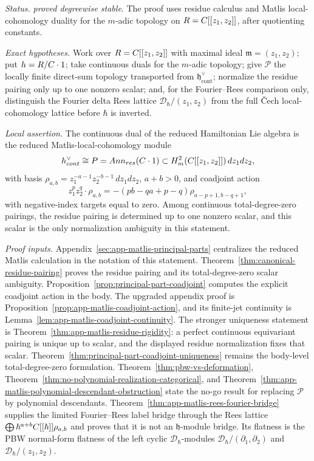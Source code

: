 \begin{stmt}\label{thm:lane-principal-parts}
  \emph{Status.} \emph{proved degreewise stable}.  The proof uses
  residue calculus and Matlis local-cohomology duality for the
  \(m\)-adic topology on \(R=C[[z_1,z_2]]\), after quotienting
  constants.

  \emph{Exact hypotheses.} Work over \(R=C[[z_1,z_2]]\) with maximal
  ideal \(\mathfrak m=(z_1,z_2)\); put
  \(h=R/C\cdot1\); take continuous duals for the
  \(m\)-adic topology; give \(\mathcal P\) the locally finite
  direct-sum topology transported from
  \(\mathfrak h^\vee_{\mathrm{cont}}\); normalize the residue pairing
  only up to one nonzero scalar; and, for the Fourier--Rees comparison
  only, distinguish the Fourier delta Rees lattice
  \(\mathcal D_\hbar/(z_1,z_2)\) from the full \v{C}ech
  local-cohomology lattice before \(\hbar\) is inverted.

  \emph{Local assertion.} The continuous dual of the reduced Hamiltonian
  Lie algebra is the reduced Matlis-local-cohomology module
  \[
    h^\vee_{cont}
    \cong
    P
    =
    Ann_{res}(C\cdot1)
    \subset
    H^2_{m}(C[[z_1,z_2]])\,dz_1dz_2,
  \]
  with basis
  \(\rho_{a,b}=z_1^{-a-1}z_2^{-b-1}\,dz_1dz_2\), \(a+b>0\), and
  coadjoint action
  \[
    z_1^p z_2^q\cdot\rho_{a,b}
    =
    -(pb-qa+p-q)\rho_{a-p+1,b-q+1},
  \]
  with negative-index targets equal to zero.  Among continuous
  total-degree-zero pairings, the residue pairing is determined up to one
  nonzero scalar, and this scalar is the only normalization ambiguity in
  this statement.

  \emph{Proof inputs.}
  Appendix~\ref{sec:app-matlis-principal-parts} centralizes the
  reduced Matlis calculation in the notation of this statement.
  Theorem~\ref{thm:canonical-residue-pairing} proves the residue
  pairing and its total-degree-zero scalar ambiguity.
  Proposition~\ref{prop:principal-part-coadjoint} computes the explicit
  coadjoint action in the body.  The upgraded appendix proof is
  Proposition~\ref{prop:app-matlis-coadjoint-action}, and its
  finite-jet continuity is Lemma~\ref{lem:app-matlis-coadjoint-continuity}.
  The stronger uniqueness statement is
  Theorem~\ref{thm:app-matlis-residue-rigidity}: a perfect continuous
  equivariant pairing is unique up to scalar, and the displayed residue
  normalization fixes that scalar.  Theorem~\ref{thm:principal-part-coadjoint-uniqueness}
  remains the body-level total-degree-zero formulation.
  Theorem~\ref{thm:pbw-vs-deformation},
  Theorem~\ref{thm:no-polynomial-realization-categorical}, and
  Theorem~\ref{thm:app-matlis-polynomial-descendant-obstruction} state
  the no-go result for replacing \(\mathcal P\) by polynomial
  descendants.
  Theorem~\ref{thm:app-matlis-rees-fourier-bridge} supplies the limited
  Fourier--Rees label bridge through the Rees lattice
  \(\bigoplus\hbar^{a+b}C[[\hbar]]\rho_{a,b}\) and proves that it is not
  an \(\mathfrak h\)-module bridge.  Its flatness is the PBW normal-form
  flatness of the left cyclic \(\mathcal D_\hbar\)-modules
  \(\mathcal D_\hbar/(\partial_1,\partial_2)\) and
  \(\mathcal D_\hbar/(z_1,z_2)\).


\end{stmt}
